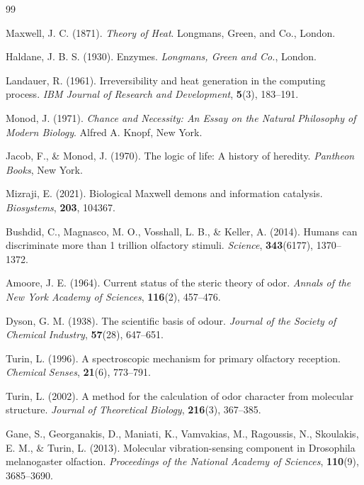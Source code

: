 \documentclass[12pt,a4paper]{article}
\begin{document}

\begin{thebibliography}{99}

Maxwell, J. C. (1871).
\textit{Theory of Heat}.
Longmans, Green, and Co., London.

Haldane, J. B. S. (1930).
Enzymes.
\textit{Longmans, Green and Co.}, London.

Landauer, R. (1961).
Irreversibility and heat generation in the computing process.
\textit{IBM Journal of Research and Development}, \textbf{5}(3), 183--191.

Monod, J. (1971).
\textit{Chance and Necessity: An Essay on the Natural Philosophy of Modern Biology}.
Alfred A. Knopf, New York.

Jacob, F., \& Monod, J. (1970).
The logic of life: A history of heredity.
\textit{Pantheon Books}, New York.

Mizraji, E. (2021).
Biological Maxwell demons and information catalysis.
\textit{Biosystems}, \textbf{203}, 104367.

Bushdid, C., Magnasco, M. O., Vosshall, L. B., \& Keller, A. (2014).
Humans can discriminate more than 1 trillion olfactory stimuli.
\textit{Science}, \textbf{343}(6177), 1370--1372.

Amoore, J. E. (1964).
Current status of the steric theory of odor.
\textit{Annals of the New York Academy of Sciences}, \textbf{116}(2), 457--476.

Dyson, G. M. (1938).
The scientific basis of odour.
\textit{Journal of the Society of Chemical Industry}, \textbf{57}(28), 647--651.

Turin, L. (1996).
A spectroscopic mechanism for primary olfactory reception.
\textit{Chemical Senses}, \textbf{21}(6), 773--791.

Turin, L. (2002).
A method for the calculation of odor character from molecular structure.
\textit{Journal of Theoretical Biology}, \textbf{216}(3), 367--385.

Gane, S., Georganakis, D., Maniati, K., Vamvakias, M., Ragoussis, N., Skoulakis, E. M., \& Turin, L. (2013).
Molecular vibration-sensing component in Drosophila melanogaster olfaction.
\textit{Proceedings of the National Academy of Sciences}, \textbf{110}(9), 3685--3690.


\end{thebibliography}
\end{document}
